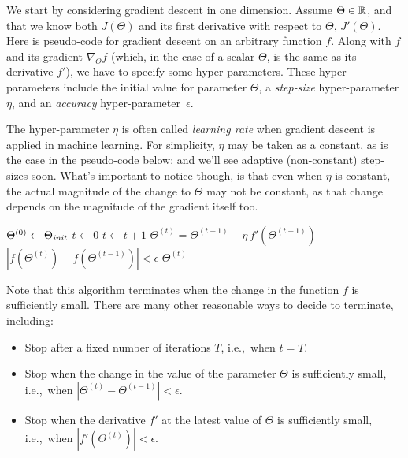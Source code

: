 We start by considering gradient descent in one dimension. Assume
$\Theta \in \mathbb{R}$, and that we know both $J(\Theta)$ and its first
derivative with respect to $\Theta$, $J'(\Theta)$.  Here is pseudo-code
for gradient descent on an arbitrary function $f$.  Along with $f$ and
its gradient
$\nabla_{\Theta}f$ (which, in the case of a scalar $\Theta$, is the same as its derivative $f'$),
we have to specify some hyper-parameters.
These hyper-parameters include the initial value for parameter $\Theta$, a {\em step-size}
hyper-parameter $\eta$, and an {\em accuracy} hyper-parameter~$\epsilon$.

The hyper-parameter $\eta$ is often called {\em learning rate} when
gradient descent is applied in machine learning. For simplicity, $\eta$ may be taken as a constant, as is the case in the pseudo-code below; and we'll see adaptive (non-constant) step-sizes soon. What's important to notice though, is that even when $\eta$ is constant, the actual magnitude of the
change to $\Theta$ may not be constant, as that change depends on the
magnitude of the gradient itself too.

\begin{codebox}
  \li $\Theta^{(0)} \gets \Theta_{\it init}$
  \li $t \gets 0$
  \li \Repeat
  \li   $t \gets t+1$
  \li   $\Theta^{(t)} = \Theta^{(t-1)} - \eta \, f'(\Theta^{(t-1)})$
  \li \Until $|f(\Theta^{(t)}) - f(\Theta^{(t-1)})| < \epsilon$
  \li \Return $\Theta^{(t)}$
\end{codebox}
Note that this algorithm terminates when the change in the function $f$
is sufficiently small. There are many other reasonable ways to decide
to terminate, including:
\begin{itemize}
  \item Stop after a fixed number of iterations $T$, i.e.,\ when $t = T$.
  \item Stop when the change in the value of the parameter
        $\Theta$ is sufficiently small, i.e.,\ when $\left| \Theta^{(t)} - \Theta^{(t-1)} \right|
          <\epsilon$.
  \item Stop when the derivative $f'$ at the latest value of $\Theta$ is sufficiently small, i.e.,\ when $\left|f'(\Theta^{(t)}) \right|
          <\epsilon$.
\end{itemize}


